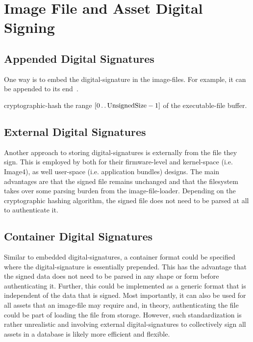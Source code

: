 \section{Image File and Asset Digital Signing}

\subsection{Appended Digital Signatures}

One way is to embed the \gls{digital-signature} in the \glspl{image-file}. For example, it can be appended to its end~\cite{pe-authenticode,linux-kmod-sig}.

\begin{algorithm}
  \caption{Hashing an Executable File With an Appended Digital Signature.}
  \label{algo:ehash}
  \begin{algorithmic}[1]
    \State \Gls{cryptographic-hash} the range $[0 \twodots \text{\lstinline{UnsignedSize}} - 1]$ of the \gls{executable-file} buffer.
  \end{algorithmic}
\end{algorithm}

\subsection{External Digital Signatures}

Another approach to storing \glspl{digital-signature} is externally from the file they sign. This is employed by  both for their \gls{firmware}-level and \gls{kernel-space} (i.e.  Image4), as well user-space (i.e.  application bundles) designs. The main advantages are that the signed file remains unchanged and that the filesystem takes over some parsing burden from the \gls{image-file-loader}. Depending on the cryptographic hashing algorithm, the signed file does not need to be parsed at all to authenticate it.

\subsection{Container Digital Signatures}

Similar to embedded \glspl{digital-signature}, a container format could be specified where the \gls{digital-signature} is essentially prepended. This has the advantage that the signed data does not need to be parsed in any shape or form before authenticating it. Further, this could be implemented as a generic format that is independent of the data that is signed. Most importantly, it can also be used for all assets that an \gls{image-file} may require and, in theory, authenticating the file could be part of loading the file from storage. However, such standardization is rather unrealistic and involving external \glspl{digital-signature} to collectively sign all assets in a database is likely more efficient and flexible.

